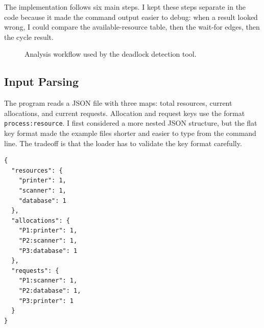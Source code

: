 \documentclass[10pt]{article}
\begin{document}
The implementation follows six main steps. I kept these steps separate in the code because it made the command output easier to debug: when a result looked wrong, I could compare the available-resource table, then the wait-for edges, then the cycle result.

\begin{figure}[H]
\centering
{}
\caption{Analysis workflow used by the deadlock detection tool.}
\end{figure}

\subsection{Input Parsing}

The program reads a JSON file with three maps: total resources, current allocations, and current requests. Allocation and request keys use the format \texttt{process:resource}. I first considered a more nested JSON structure, but the flat key format made the example files shorter and easier to type from the command line. The tradeoff is that the loader has to validate the key format carefully.

\begin{lstlisting}[style=code,caption={Example deadlock scenario}]
{
  "resources": {
    "printer": 1,
    "scanner": 1,
    "database": 1
  },
  "allocations": {
    "P1:printer": 1,
    "P2:scanner": 1,
    "P3:database": 1
  },
  "requests": {
    "P1:scanner": 1,
    "P2:database": 1,
    "P3:printer": 1
  }
}
\end{lstlisting}
\end{document}
